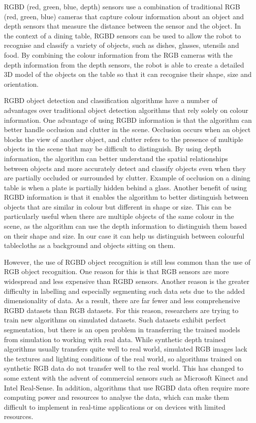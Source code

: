 \documentclass[10pt,twocolumn,letterpaper]{article}
\begin{document}
RGBD (red, green, blue, depth) sensors \cite{Tychola_Tsimperidis_Papakostas_2022} use a combination of traditional RGB (red, green, blue) cameras that capture colour information about an object and depth sensors that measure the distance between the sensor and the object. In the context of a dining table, RGBD sensors can be used to allow the robot to recognise and classify a variety of objects, such as dishes, glasses, utensils and food. By combining the colour information from the RGB cameras with the depth information from the depth sensors, the robot is able to create a detailed 3D model of the objects on the table so that it can recognise their shape, size and orientation.

RGBD object detection and classification algorithms have a number of advantages over traditional object detection algorithms that rely solely on colour information\cite{Rosin_Lai_Shao_Liu_2019}. One advantage of using RGBD information is that the algorithm can better handle occlusion and clutter in the scene. Occlusion occurs when an object blocks the view of another object, and clutter refers to the presence of multiple objects in the scene that may be difficult to distinguish. By using depth information, the algorithm can better understand the spatial relationships between objects and more accurately detect and classify objects even when they are partially occluded or surrounded by clutter. Example of occlusion on a dining table is when a plate is partially hidden behind a glass. Another benefit of using RGBD information is that it enables the algorithm to better distinguish between objects that are similar in colour but different in shape or size. This can be particularly useful when there are multiple objects of the same colour in the scene, as the algorithm can use the depth information to distinguish them based on their shape and size. In our case it can help us distinguish between colourful tablecloths as a background and objects sitting on them. 

However, the use of RGBD object recognition is still less common than the use of RGB object recognition. One reason for this is that RGB sensors are more widespread and less expensive than RGBD sensors. Another reason is the greater difficulty in labelling and especially segmenting such data sets due to the added dimensionality of data. As a result, there are far fewer and less comprehensive RGBD datasets than RGB datasets. For this reason, researchers are trying to train new algorithms on simulated datasets. Such datasets exhibit perfect segmentation, but there is an open problem in transferring the trained models from simulation to working with real data. While synthetic depth trained algorithms usually transfers quite well to real world, simulated RGB images lack the textures and lighting conditions of the real world, so algorithms trained on synthetic RGB data do not transfer well to the real world. This has changed to some extent with the advent of commercial sensors such as Microsoft Kinect and Intel Real-Sense. In addition, algorithms that use RGBD data often require more computing power and resources to analyse the data, which can make them difficult to implement in real-time applications or on devices with limited resources.
\end{document}
